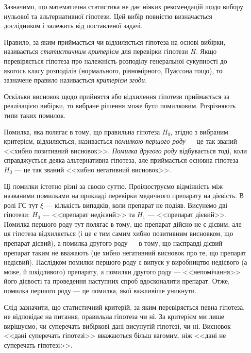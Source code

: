 Зазначимо, що математична статистика не дає ніяких рекомендацій
щодо вибору нульової та альтернативної гіпотези. Цей вибір повністю 
визначається дослідником і залежить від поставленої задачі.
\begin{definition}
    Правило, за яким приймається чи відхиляється гіпотеза на 
    основі вибірки, називається \emph{статистичним критерієм} для перевірки 
    гіпотези $H$. Якщо перевіряється гіпотеза про належність розподілу 
    генеральної сукупності до якогось класу розподілів (нормального, 
    рівномірного, Пуассона тощо), то зазначене правило називається \emph{критерієм згоди}.
\end{definition}
Оскільки висновок щодо прийняття або відхилення гіпотези 
приймається за реалізацією вибірки, то вибране рішення може бути 
помилковим. Розрізняють типи таких помилок.

\begin{definition}
    Помилка, яка полягає в тому, що правильна гіпотеза $H_0$, 
    згідно з вибраним критерієм, відхиляється, називається \emph{помилкою першого роду} --- це так званий <<хибно позитивний висновок>>. 
    \emph{Помилка другого роду} відбувається тоді, коли справджується 
    деяка альтернативна гіпотеза, але приймається основна гіпотеза $H_0$ --- це так званий <<хибно негативний висновок>>.
\end{definition}
Ці помилки істотно різні за своєю суттю. Проілюструємо відмінність 
між названими помилками на прикладі перевірки медичного препарату на дієвість.
В ролі ГС тут $\xi$ --- кількість випадків, коли препарат не подіяв. Висунемо дві гіпотези:
$H_0$ --- <<препарат недієвий>> та $H_1$ --- <<препарат дієвий>>. Помилка першого роду тут полягає в тому, що препарат дійсно не є дієвим,
але ця гіпотеза відхиляється (і це є тим самим хибно позитивним висновком, що препарат дієвий), 
а помилка другого роду --- в тому, що насправді дієвий препарат таким не вважають (це хибно негативний висновок про те, що препарат недієвий).
Наслідком помилки першого роду є випуск у виробництво недієвого (а може, й шкідливого) препарату, а помилки другого роду --- <<непомічання>> 
його дієвості та проведення наступних спроб вдосконалити препарат. Отже, помилка першого роду --- це помилка, якої важливіше 
уникнути.

Слід зазначити, що статистичний критерій, за яким перевіряється певна 
гіпотеза, не відповідає на питання, правильна гіпотеза чи ні. За критерієм ми 
лише вирішуємо, чи суперечать вибіркові дані висунутій гіпотезі, чи ні. Висновок <<дані 
суперечать гіпотезі>> вважаються більш вагомим, ніж <<дані не суперечать гіпотезі>>.


